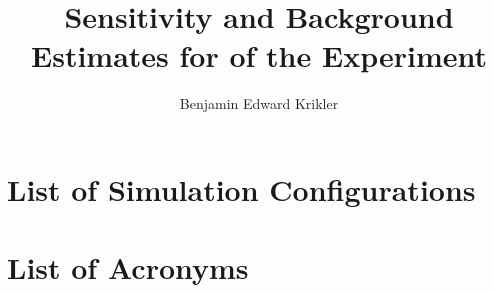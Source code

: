 \documentclass{thesis}
\title{Sensitivity and Background Estimates for \phaseII of the \COMET Experiment}
\author{Benjamin Edward Krikler}
\begin{document}
\begin{frontmatter}
  
\end{frontmatter}

\begin{mainmatter}





%
%
%




\end{mainmatter}

\begin{appendices}



\end{appendices}

\begin{backmatter}
\chapter{List of Simulation Configurations}
\chapter{List of Acronyms}

\end{backmatter}


%

\end{document}
